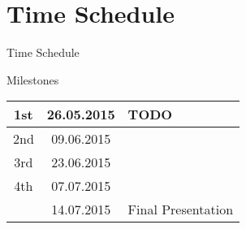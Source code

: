 \documentclass{beamer}
\newcommand{\beginbackup}{
   \newcounter{framenumbervorappendix}
   \setcounter{framenumbervorappendix}{\value{framenumber}}
}
\newcommand{\backupend}{
   \addtocounter{framenumbervorappendix}{-\value{framenumber}}
   \addtocounter{framenumber}{\value{framenumbervorappendix}}
}
\begin{document}
\section{Time Schedule}
\begin{frame}{Time Schedule}

	{\Huge Milestones}
	\vspace{1cm}


	\Large
	\begin{tabular}{|c|c|l|}
		\hline
		1st	&	26.05.2015	&	TODO \\ \hline
		2nd	&	09.06.2015	&	\\ \hline
		3rd	&	23.06.2015	&	\\ \hline
		4th	&	07.07.2015	&	\\ \hline
			&	14.07.2015	&	Final Presentation	\\ \hline
	\end{tabular}

\end{frame}







\end{document}
